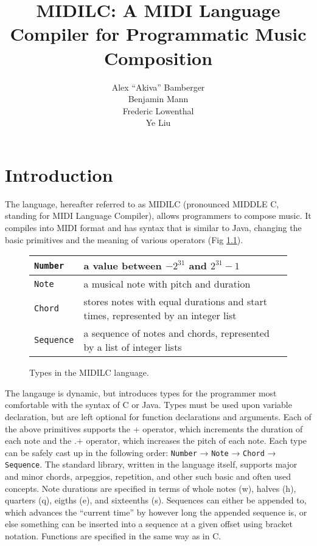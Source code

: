 \documentclass[12pt,A4]{book}
\title{MIDILC:  A MIDI Language Compiler for Programmatic Music Composition}
\author{Alex ``Akiva'' Bamberger \\ Benjamin Mann \\ Frederic Lowenthal \\ Ye Liu}
\date{}
\begin{document}
\maketitle
\newpage
\tableofcontents
\newpage

\chapter{Introduction}
The language, hereafter referred to as MIDILC (pronounced MIDDLE C, standing for MIDI
Language Compiler), allows programmers to compose music. It compiles into MIDI format and
has syntax that is similar to Java, changing the basic primitives and the meaning of various
operators (Fig \ref{fig:types_in_midilc}).

\begin{figure}
\center
\begin{tabular}{|p{}|p{}|}
\hline
\verb|Number| & a value between $-2^{31}$ and $2^{31}-1$\\ \hline
\verb|Note| & a musical note with pitch and duration \\ \hline
\verb|Chord| & stores notes with equal durations and start times, represented by an integer list \\ \hline
\verb|Sequence| & a sequence of notes and chords, represented by a list of integer lists \\ \hline
\end{tabular}
\caption{Types in the MIDILC language. }
\label{fig:types_in_midilc}
\end{figure}

The langauge is dynamic, but introduces types for the programmer most comfortable with the syntax of C or Java. Types must be used upon variable declaration, but are left optional for function declarations and arguments. Each of the above primitives supports the + operator, which increments the duration of each note and the .+ operator, which increases the pitch of each note. Each type can be safely cast up in the following order: \verb|Number| → \verb|Note| → \verb|Chord| → \verb|Sequence|. The standard library, written in the language itself, supports major and minor chords, arpeggios, repetition, and other such basic and often used concepts. Note durations are specified in terms of whole notes (w), halves (h), quarters (q), eigths (e), and sixteenths (s). Sequences can either be appended to, which advances the ``current time'' by however long the appended sequence is, or else something can be inserted into a sequence at a given offset using bracket notation. Functions are specified in the same way as in C.
\end{document}
